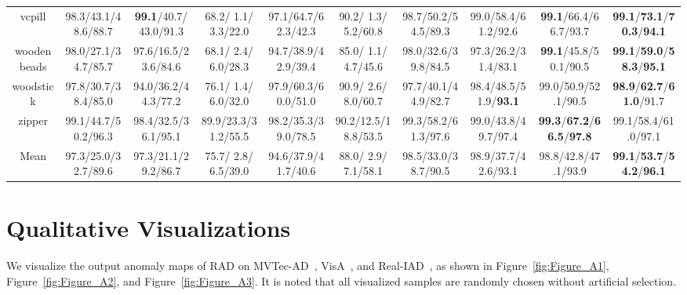 \documentclass{article}
\theoremstyle{plain}
\theoremstyle{definition}
\theoremstyle{remark}
\begin{document}
\begin{table}[p]
{\begin{tabular}{ccccccccc>{\columncolor{oursblue}}c}
vcpill           & 98.3/43.1/48.6/88.7 & \textbf{99.1}/40.7/43.0/91.3 & 68.2/ 1.1/ 3.3/22.0 & 97.1/64.7/62.3/42.3 & 90.2/ 1.3/ 5.2/60.8 & 98.7/50.2/54.5/89.3 & 99.0/58.4/61.2/92.6 & \textbf{99.1}/66.4/66.7/93.7 & \textbf{99.1}/\textbf{73.1}/\textbf{70.3}/\textbf{94.1} \\
\cellcolor{rowgray} wooden beads & \cellcolor{rowgray} 98.0/27.1/34.7/85.7 & \cellcolor{rowgray} 97.6/16.5/23.6/84.6 & \cellcolor{rowgray} 68.1/ 2.4/ 6.0/28.3 & \cellcolor{rowgray} 94.7/38.9/42.9/39.4 & \cellcolor{rowgray} 85.0/ 1.1/ 4.7/45.6 & \cellcolor{rowgray} 98.0/32.6/39.8/84.5 & \cellcolor{rowgray} 97.3/26.2/31.4/83.1 & \cellcolor{rowgray} \textbf{99.1}/45.8/50.1/90.5 & \textbf{99.1}/\textbf{59.0}/\textbf{58.3}/\textbf{95.1} \\
woodstick        & 97.8/30.7/38.4/85.0 & 94.0/36.2/44.3/77.2 & 76.1/ 1.4/ 6.0/32.0 & 97.9/60.3/60.0/51.0 & 90.9/ 2.6/ 8.0/60.7 & 97.7/40.1/44.9/82.7 & 98.4/48.5/51.9/\textbf{93.1} & 99.0/50.9/52.1/90.5 & \textbf{98.9}/\textbf{62.7}/\textbf{61.0}/91.7 \\
\cellcolor{rowgray} zipper & \cellcolor{rowgray} 99.1/44.7/50.2/96.3 & \cellcolor{rowgray} 98.4/32.5/36.1/95.1 & \cellcolor{rowgray} 89.9/23.3/31.2/55.5 & \cellcolor{rowgray} 98.2/35.3/39.0/78.5 & \cellcolor{rowgray} 90.2/12.5/18.8/53.5 & \cellcolor{rowgray} 99.3/58.2/61.3/97.6 & \cellcolor{rowgray} 99.0/43.8/49.7/97.4 & \cellcolor{rowgray} \textbf{99.3}/\textbf{67.2}/\textbf{66.5}/\textbf{97.8} & 99.1/58.4/61.0/97.1 \\
\midrule
Mean             & 97.3/25.0/32.7/89.6 & 97.3/21.1/29.2/86.7 & 75.7/ 2.8/ 6.5/39.0 & 94.6/37.9/41.7/40.6 & 88.0/ 2.9/ 7.1/58.1 & 98.5/33.0/38.7/90.5 & 98.9/37.7/42.6/93.1 & 98.8/42.8/47.1/93.9 & \textbf{99.1}/\textbf{53.7}/\textbf{54.2}/\textbf{96.1} \\
\bottomrule
\end{tabular}
}
\end{table}


\section{Qualitative Visualizations}
\label{sec:visualization}
We visualize the output anomaly maps of RAD on MVTec-AD~\cite{bergmann2019mvtec}, VisA~\cite{zou2022spot}, and Real-IAD~\cite{wang2024real}, as shown in Figure~\ref{fig:Figure_A1}, Figure~\ref{fig:Figure_A2}, and Figure~\ref{fig:Figure_A3}. It is noted that all visualized samples are randomly chosen without artificial selection.
\end{document}
